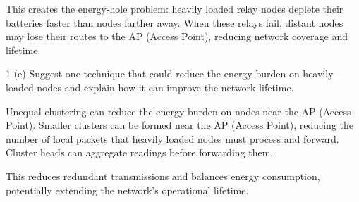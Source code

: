 This creates the energy-hole problem: heavily loaded relay nodes deplete their batteries faster than nodes farther
away. When these relays fail, distant nodes may lose their routes to the AP (Access Point), reducing network coverage and
lifetime.


\begin{question}{1 (e)}
Suggest one technique that could reduce the energy burden on heavily loaded nodes and explain how it can improve the
network lifetime.
\end{question}

Unequal clustering can reduce the energy burden on nodes near the AP (Access Point). Smaller clusters can be formed near the AP (Access Point),
reducing the number of local packets that heavily loaded nodes must process and forward. Cluster heads can aggregate
readings before forwarding them.

This reduces redundant transmissions and balances energy consumption, potentially extending the network's
operational lifetime.
